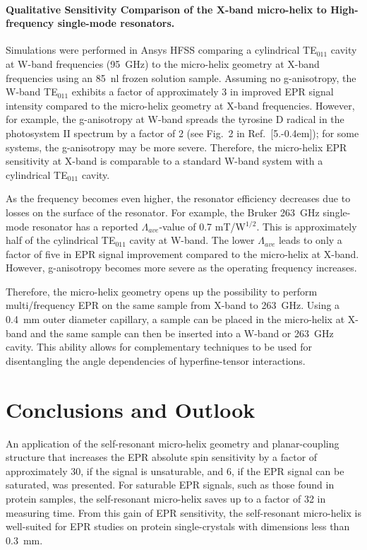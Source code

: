 \paragraph{Qualitative Sensitivity Comparison of the X-band micro-helix to High-frequency single-mode resonators.}
Simulations were performed in Ansys HFSS comparing a cylindrical TE$_{011}$ cavity at W-band frequencies (95~GHz) to the micro-helix geometry at X-band frequencies using an 85~nl frozen solution sample. Assuming no g-anisotropy, the W-band TE$_{011}$ exhibits a factor of approximately 3 in improved EPR signal intensity compared to the micro-helix geometry at X-band frequencies. However, for example, the g-anisotropy at W-band spreads the tyrosine D radical in the photosystem II spectrum by a factor of 2 (see Fig.~2 in Ref.~[5.\kern-0.4em]); for some systems, the g-anisotropy may be more severe. Therefore, the micro-helix EPR sensitivity at X-band is comparable to a standard W-band system with a cylindrical TE$_{011}$ cavity. 

As the frequency becomes even higher, the resonator efficiency decreases due to losses on the surface of the resonator. For example, the Bruker 263~GHz single-mode resonator has a reported $\Lambda_{ave}$-value of 0.7 mT/W$^{1/2}$. \cite{bruker263} This is approximately half of the cylindrical TE$_{011}$ cavity at W-band. The lower $\Lambda_{ave}$ leads to only a factor of five in EPR signal improvement compared to the micro-helix at X-band. However, g-anisotropy becomes more severe as the operating frequency increases.

Therefore, the micro-helix geometry opens up the possibility to perform multi\-/frequency EPR on the same sample from X-band to 263~GHz. Using a 0.4~mm outer diameter capillary, a sample can be placed in the micro-helix at X-band and the same sample can then be inserted into a W-band or 263~GHz cavity. This ability allows for complementary techniques to be used for disentangling the angle dependencies of hyperfine-tensor interactions.


\section{Conclusions and Outlook}
An application of the self-resonant micro-helix geometry and planar-coupling structure that increases the EPR absolute spin sensitivity by a factor of approximately 30, if the signal is unsaturable, and 6, if the EPR signal can be saturated, was presented. For saturable EPR signals, such as those found in protein samples, the self-resonant micro-helix saves up to a factor of 32 in measuring time. From this gain of EPR sensitivity, the self-resonant micro-helix is well-suited for EPR studies on protein single-crystals with dimensions less than 0.3~mm. 

